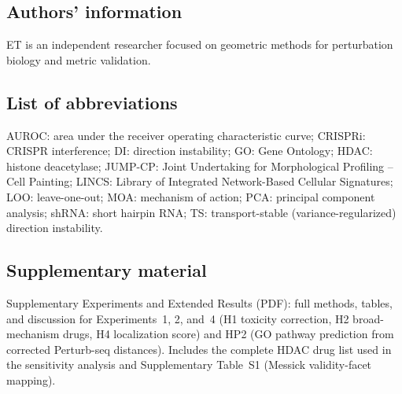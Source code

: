 \documentclass[11pt]{article}
\begin{document}
\subsection*{Authors' information}
ET is an independent researcher focused on geometric methods
for perturbation biology and metric validation.

\subsection*{List of abbreviations}
AUROC: area under the receiver operating characteristic curve;
CRISPRi: CRISPR interference;
DI: direction instability;
GO: Gene Ontology;
HDAC: histone deacetylase;
JUMP-CP: Joint Undertaking for Morphological Profiling -- Cell Painting;
LINCS: Library of Integrated Network-Based Cellular Signatures;
LOO: leave-one-out;
MOA: mechanism of action;
PCA: principal component analysis;
shRNA: short hairpin RNA;
TS: transport-stable (variance-regularized) direction instability.

\subsection*{Supplementary material}
Supplementary Experiments and Extended Results (PDF):
full methods, tables, and discussion for Experiments~1, 2, and~4
(H1 toxicity correction, H2 broad-mechanism drugs, H4 localization
score) and HP2 (GO pathway prediction from corrected Perturb-seq
distances). Includes the complete HDAC drug list used in the
sensitivity analysis and Supplementary Table~S1 (Messick validity-facet
mapping).



\end{document}

